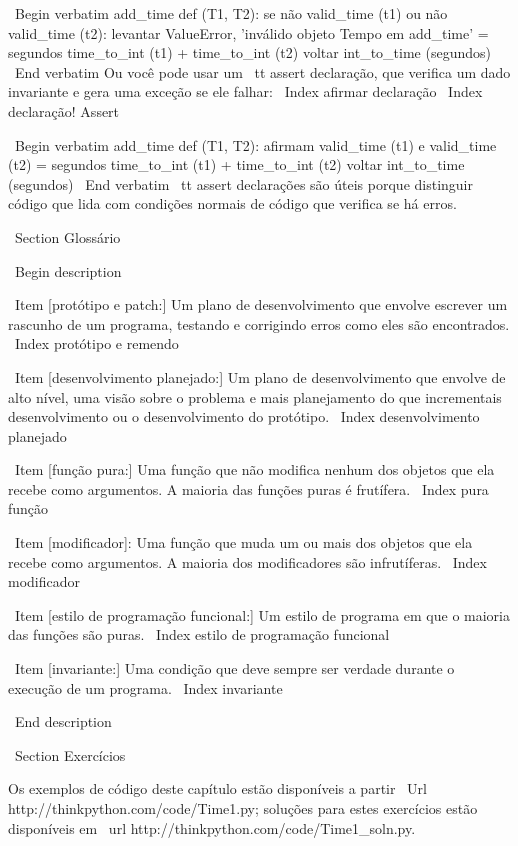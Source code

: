 \documentclass[10pt]{book}
\begin{document}
{{{{{{{{{{{{{{\ Begin {verbatim}
add_time def (T1, T2):
    se não valid_time (t1) ou não valid_time (t2):
        levantar ValueError, 'inválido objeto Tempo em add_time'
    = segundos time_to_int (t1) + time_to_int (t2)
    voltar int_to_time (segundos)
\ End {verbatim}
%
Ou você pode usar um {\ tt assert} declaração, que verifica um dado invariante
e gera uma exceção se ele falhar:
\ Index {afirmar declaração}
\ Index {declaração! Assert}

\ Begin {verbatim}
add_time def (T1, T2):
    afirmam valid_time (t1) e valid_time (t2)
    = segundos time_to_int (t1) + time_to_int (t2)
    voltar int_to_time (segundos)
\ End {verbatim}
%
{\ tt assert} declarações são úteis porque distinguir
código que lida com condições normais de código
que verifica se há erros.


\ Section {} Glossário

\ Begin {description}

\ Item [protótipo e patch:] Um plano de desenvolvimento que envolve
escrever um rascunho de um programa, testando e corrigindo erros como
eles são encontrados.
\ Index {protótipo e remendo}

\ Item [desenvolvimento planejado:] Um plano de desenvolvimento que envolve
de alto nível, uma visão sobre o problema e mais planejamento do que incrementais
desenvolvimento ou o desenvolvimento do protótipo.
\ Index {desenvolvimento planejado}

\ Item [função pura:] Uma função que não modifica nenhum dos objetos que ela
recebe como argumentos. A maioria das funções puras é frutífera.
\ Index {pura função}

\ Item [modificador]: Uma função que muda um ou mais dos objetos que ela
recebe como argumentos. A maioria dos modificadores são infrutíferas.
\ Index {} modificador

\ Item [estilo de programação funcional:] Um estilo de programa em que o
maioria das funções são puras.
\ Index {estilo de programação funcional}

\ Item [invariante:] Uma condição que deve sempre ser verdade durante o
execução de um programa.
\ Index {} invariante

\ End {description}


\ Section {Exercícios}

Os exemplos de código deste capítulo estão disponíveis a partir
\ Url {http://thinkpython.com/code/Time1.py}; soluções para estes
exercícios estão disponíveis em \ url {http://thinkpython.com/code/Time1_soln.py}.

}}}}}}}}}}}}}}
\end{document}
